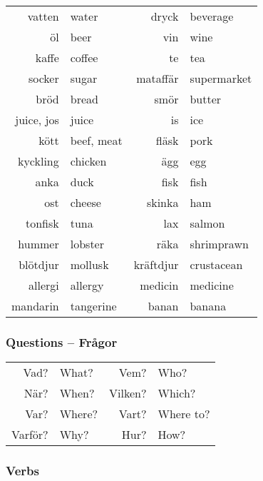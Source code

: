 \documentclass[14pt]{refcard} %
\begin{document}
\begin{tabular}{@{} r@{\ \ }l @{\hspace{-1ex}} rl @{}}
vatten      & water       & dryck       & beverage    \\
öl          & beer        & vin         & wine        \\
kaffe       & coffee      & te          & tea         \\
socker      & sugar       & mataffär    & supermarket \\
bröd        & bread       & smör        & butter      \\
juice, jos  & juice       & is          & ice         \\
kött        & beef, meat  & fläsk       & pork        \\
kyckling    & chicken     & ägg         & egg         \\
anka        & duck        & fisk        & fish        \\
ost         & cheese      & skinka      & ham         \\
tonfisk     & tuna        & lax         & salmon      \\
hummer      & lobster     & räka        & shrimprawn  \\
blötdjur    & mollusk     & kräftdjur   & crustacean  \\
allergi     & allergy     & medicin     & medicine    \\
mandarin    & tangerine   & banan       & banana      \\
\end{tabular}


\subsubsection{Questions -- Frågor}

\begin{tabular}{rl rl}

Vad?       & What?     & Vem?       & Who?      \\
När?       & When?     & Vilken?    & Which?    \\
Var?       & Where?    & Vart?      & Where to? \\
Varför?    & Why?      & Hur?       & How?      \\
\end{tabular}


\subsubsection{Verbs}
\end{document}

